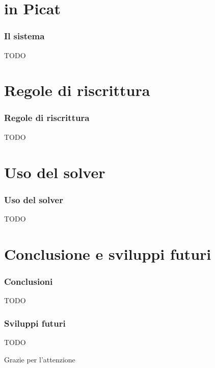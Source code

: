 \documentclass{beamer}
\begin{document}
\section{\lset{} in Picat}

\begin{frame}
  \frametitle{Il sistema}
  TODO
\end{frame}

\section{Regole di riscrittura}

\begin{frame}
	\frametitle{Regole di riscrittura}
	TODO
\end{frame}

\section{Uso del solver}

\begin{frame}
	\frametitle{Uso del solver}
	TODO
\end{frame}

\section{Conclusione e sviluppi futuri}

\begin{frame}
  \frametitle{Conclusioni}
  TODO
\end{frame}


\begin{frame}
  \frametitle{Sviluppi futuri}
  TODO
\end{frame}


\begin{frame}
  \Huge{\centerline{Grazie per l'attenzione}}
\end{frame}

\end{document}
